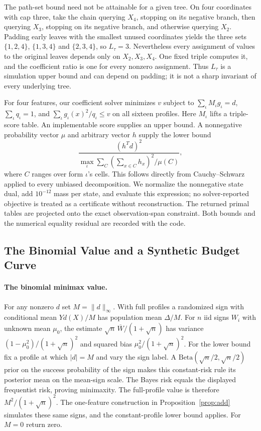 The path-set bound need not be attainable for a given tree. On four
coordinates with cap three, take the chain querying $X_4$, stopping on its
negative branch, then querying $X_3$, stopping on its negative branch,
and otherwise querying $X_2$. Padding early leaves with the smallest unused
coordinates yields the three sets $\{1,2,4\}$, $\{1,3,4\}$ and
$\{2,3,4\}$, so $L_\tau=3$. Nevertheless every assignment of values to
the original leaves depends only on $X_2,X_3,X_4$. One fixed triple
computes it, and the coefficient ratio is one for every nonzero assignment.
Thus $L_\tau$ is a simulation upper bound and can depend on padding; it
is not a sharp invariant of every underlying tree.

For four features, our coefficient solver minimizes $v$ subject to $\sum_\iota M_\iota g_\iota=d$, $\sum_\iota q_\iota=1$, and $\sum_\iota g_\iota(x)^2/q_\iota\le v$ on all sixteen profiles. Here $M_\iota$ lifts a triple-score table. An implementable score supplies an upper bound. A nonnegative probability vector $\mu$ and arbitrary vector $h$ supply the lower bound
\[
 \frac{(h^Td)^2}{\max_\iota\sum_C (\sum_{x\in C}h_x)^2/\mu(C)},
\]
where $C$ ranges over form $\iota$'s cells. This follows directly from Cauchy--Schwarz applied to every unbiased decomposition. We normalize the nonnegative state dual, add $10^{-12}$ mass per state, and evaluate this expression; no solver-reported objective is treated as a certificate without reconstruction. The returned primal tables are projected onto the exact observation-span constraint. Both bounds and the numerical equality residual are recorded with the code.



\subsection{The Binomial Value and a Synthetic Budget Curve}\label{app:sign}
\paragraph{The binomial minimax value.}
For any nonzero $d$ set $M=\|d\|_\infty$. With full profiles a randomized sign with conditional mean $Yd(X)/M$ has population mean $\Delta/M$. For $n$ iid signs $W_i$ with unknown mean $\mu_0$, the estimate $\sqrt n\,\overline W/(1+\sqrt n)$ has variance $(1-\mu_0^2)/(1+\sqrt n)^2$ and squared bias $\mu_0^2/(1+\sqrt n)^2$. For the lower bound fix a profile at which $|d|=M$ and vary the sign label. A $\mathrm{Beta}(\sqrt n/2,\sqrt n/2)$ prior on the success probability of the sign makes this constant-risk rule its posterior mean on the mean-sign scale. The Bayes risk equals the displayed frequentist risk, proving minimaxity. The full-profile value is therefore $M^2/(1+\sqrt n)^2$. The one-feature construction in Proposition~\ref{prop:add} simulates these same signs, and the constant-profile lower bound applies. For $M=0$ return zero.

